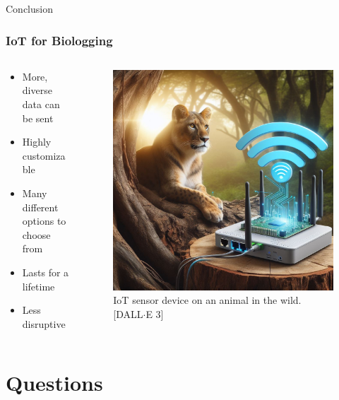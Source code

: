 \documentclass{beamer}
\begin{document}
\begin{frame}{Conclusion}
  \frametitle{IoT for Biologging}
  \begin{columns}
    \begin{column}{0.5\textwidth}
      \begin{itemize}
        \item More, diverse data can be sent
        \item Highly customizable
        \item Many different options to choose from
        \item Lasts for a lifetime
        \item Less disruptive
      \end{itemize}
    \end{column}
    \begin{column}{0.5\textwidth}
      \begin{figure}[htbp]
        \centering
        \includegraphics[width=.9\textwidth]{IoT_Lion.jpg}
        \caption{IoT sensor device on an animal in the wild. [DALL$\cdot$E 3]}
        \label{fig:IoT_Lion}
      \end{figure}
    \end{column}
  \end{columns}
\end{frame}

\section{Questions}
\end{document}
